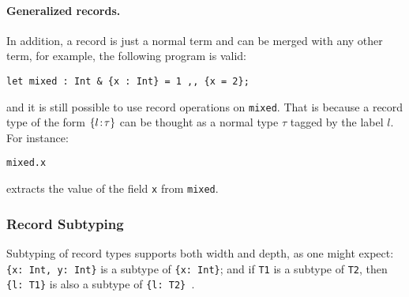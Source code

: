 \paragraph{Generalized records.}
In addition, a record is just a normal term and can be merged with any other
term, for example, the following program is valid:
\begin{lstlisting}
let mixed : Int & {x : Int} = 1 ,, {x = 2};
\end{lstlisting}
and it is still possible to use record operations on
\lstinline{mixed}. That is because a record type of the form $ \{ l \!:\! \tau \} $ can be thought as a normal type $ \tau $ tagged by the label
$ l $. For instance:
\begin{lstlisting}
mixed.x
\end{lstlisting}

\noindent extracts the value of the field \lstinline{x} from \lstinline{mixed}.

\subsubsection{Record Subtyping}

Subtyping of record types supports both width and depth, as one might
expect: \lstinline${x: Int, y: Int}$ is a subtype of
\lstinline${x: Int}$; and if \lstinline$T1$ is a subtype of
\lstinline$T2$, then \lstinline${l: T1}$ is also a subtype of
\lstinline${l: T2} $.




